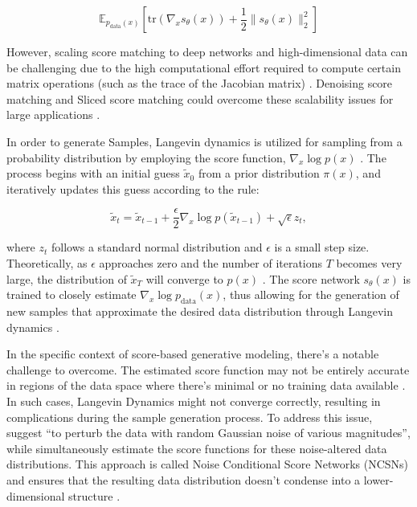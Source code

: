 \[
\mathbb{E}_{p_{\text{data}}(x)} \left[ \text{tr}(\nabla_x s_\theta(x)) + \frac{1}{2} \|s_\theta(x)\|^2_2 \right]
\]

\citep{song2019SGM} However, scaling score matching to deep networks and high-dimensional data can be challenging due to the high computational effort required to compute certain matrix operations (such as the trace of the Jacobian matrix) \citep{song2019SGM}. 
Denoising score matching and Sliced score matching could overcome these scalability issues for large applications \citep{song2019SGM}.

In order to generate Samples, Langevin dynamics \citep{robertsLangevin} is utilized for sampling from a probability distribution by employing the score function, \( \nabla_x \log p(x) \) \citep{song2019SGM}. The process begins with an initial guess \( \tilde{x}_0 \) from a prior distribution \( \pi(x) \), and iteratively updates this guess according to the rule:

\[ \tilde{x}_t = \tilde{x}_{t-1} + \frac{\epsilon}{2} \nabla_x \log p(\tilde{x}_{t-1}) + \sqrt{\epsilon} z_t, \]

\citep{song2019SGM} where \( z_t \) follows a standard normal distribution and \( \epsilon \) is a small step size. Theoretically, as \( \epsilon \) approaches zero and the number of iterations \( T \) becomes very large, the distribution of \( \tilde{x}_T \) will converge to \( p(x) \) \citep{song2019SGM}. The score network \( s_\theta(x) \) is trained to closely estimate \( \nabla_x \log p_{\text{data}}(x) \), thus allowing for the generation of new samples that approximate the desired data distribution through Langevin dynamics \citep{song2019SGM}.

In the specific context of score-based generative modeling, there's a notable challenge to overcome. The estimated score function may not be entirely accurate in regions of the data space where there's minimal or no training data available \citep{song2019SGM}. In such cases, Langevin Dynamics might not converge correctly, resulting in complications during the sample generation process. To address this issue,~\cite{song2019SGM} suggest ``to perturb the data with random Gaussian noise of various magnitudes'', while simultaneously estimate the score functions for these noise-altered data distributions. This approach is called Noise Conditional Score Networks (NCSNs) and ensures that the resulting data distribution doesn't condense into a lower-dimensional structure \citep{song2019SGM}.




